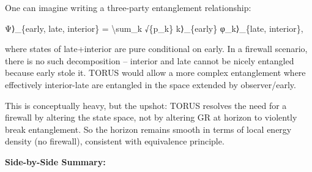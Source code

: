 \documentclass[]{article}
\begin{document}
One can imagine writing a three-party entanglement relationship:

\textbar{}Ψ⟩\_\{early, late, interior\} = \textbackslash{}sum\_k
√\{p\_k\} \textbar{}k⟩\_\{early\} \textbar{}φ\_k⟩\_\{late, interior\},

where states of late+interior are pure conditional on early. In a
firewall scenario, there is no such decomposition -- interior and late
cannot be nicely entangled because early stole it. TORUS would allow a
more complex entanglement where effectively interior-late are entangled
in the space extended by observer/early.

This is conceptually heavy, but the upshot: TORUS resolves the need for
a firewall by altering the state space, not by altering GR at horizon to
violently break entanglement. So the horizon remains smooth in terms of
local energy density (no firewall), consistent with equivalence
principle.

\textbf{Side-by-Side Summary:}
\end{document}
